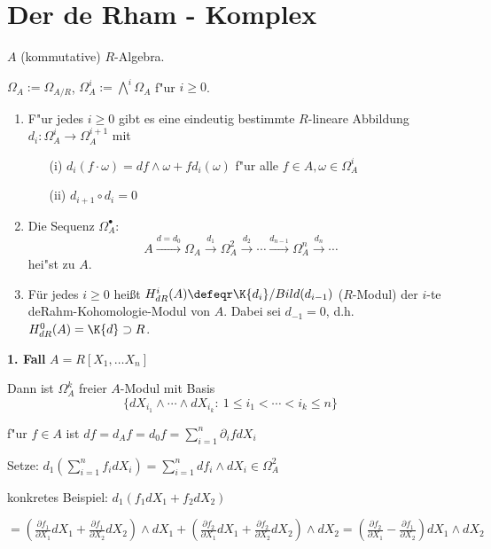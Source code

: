 \section{Der de Rham - Komplex}

$A$ (kommutative) $R$-Algebra.

$\Omega_A := \Omega_{A/R}$, $\Omega^i_A := \bigwedge\nolimits^i\Omega_A$ f"ur $i \geq 0$.

\begin{SatzDef}
\begin{enumerate}
\item F"ur jedes $i \geq 0$ gibt es eine eindeutig bestimmte $R$-lineare Abbildung $d_i : \Omega^i_A \rightarrow \Omega^{i+1}_A$ mit
\begin{enumerate}
\item[(i)] $d_i(f \cdot \omega) = df \wedge \omega + f d_i(\omega)$ f"ur alle $f \in A, \omega \in \Omega^i_A$
\item[(ii)] $d_{i+1} \circ d_i = 0$
\end{enumerate}

\item
Die Sequenz $\Omega^\bullet_A$:
$$A \overset{d=d_0}{\longrightarrow} \Omega_A \overset{d_1}{\rightarrow} \Omega^2_A \overset{d_2}{\rightarrow} \cdots \overset{d_{n-1}}{\rightarrow} \Omega^n_A  \overset{d_n}{\rightarrow} \cdots$$
hei"st  zu $A$.

\item
F\"ur jedes $i\geq 0$ hei\ss t $H_{dR}^i(A)\defeqr \K{d_i}/Bild(d_{i-1})$ ($R$-Modul)
der $i$-te deRahm-Kohomologie-Modul von $A$. Dabei sei $d_{-1}=0$, d.h. $H_{dR}^0(A)=\K{d}\supset R$.

\end{enumerate}

\begin{Bew}
\textbf{1. Fall} $A = R[X_1, \ldots X_n]$

Dann ist $\Omega^k_A$ freier $A$-Modul mit Basis
\[
\{d X_{i_1} \wedge \cdots \wedge d X_{i_k}:\ 1 \leq i_1 < \cdots < i_k \leq n\}
\]

f"ur $f \in A$ ist $df = d_A f = d_0 f = \sum_{i=1}^n \partial_i f d X_i$

Setze: $d_1(\sum_{i=1}^n f_i d X_i) = \sum_{i=1}^n d f_i \wedge d X_i \in \Omega^2_A$

konkretes Beispiel: $d_1(f_1 dX_1 + f_2 dX_2)$

$= (\frac{\partial f_1}{\partial X_1} dX_1 + \frac{\partial f_1}{\partial X_2} dX_2) \wedge dX_1 + (\frac{\partial f_2}{\partial X_1} dX_1 + \frac{\partial f_2}{\partial X_2} dX_2) \wedge dX_2 = (\frac{\partial f_2}{\partial X_1} - \frac{\partial f_1}{\partial X_2}) dX_1 \wedge dX_2$


\end{Bew}
\end{SatzDef}
